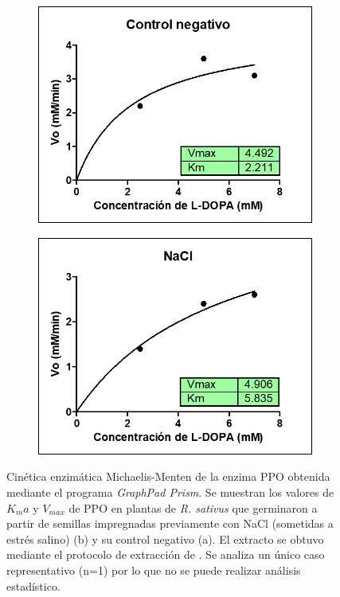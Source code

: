 \medskip
\medskip
\medskip

\begin{figure}[h!!!!]
	\begin{subfigure}{.5\textwidth}
		\centering
		\includegraphics[width=.9\linewidth]{Imagenes/POnada}
		\caption{}
		\label{a}
	\end{subfigure}
	\begin{subfigure}{.5\textwidth}
		\centering
		\includegraphics[width=.9\linewidth]{Imagenes/PONaCl}
		\caption{}
		\label{b}
	\end{subfigure}
	\caption{Cin\'etica enzim\'atica Michaelis-Menten de la enzima PPO obtenida mediante el programa \textit{GraphPad Prism}. Se muestran los valores de $K_ma$ y $V_{max}$ de PPO en plantas de \textit{R. sativus} que germinaron a partir de semillas impregnadas previamente con NaCl (sometidas a estr\'es salino) (b) y su control negativo (a). El extracto se obtuvo mediante el protocolo de extracci\'on de \citep{liu2010exogenous}. Se analiza un único caso representativo (n=1) por lo que no se puede realizar análisis estadístico.}
	\label{POkmVmax}
\end{figure}

